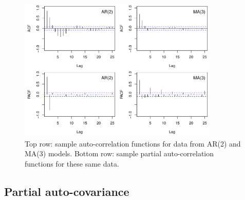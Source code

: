 \documentclass{article}
\begin{document}
\begin{itemize}
\begin{figure}[htb]
\centering
\includegraphics[width=0.85\textwidth]{fig/auto-cor-1.pdf}
\caption{Top row: sample auto-correlation functions for data from AR(2) and
  MA(3) models. Bottom row: sample partial auto-correlation functions for these
  same data.} 
\label{fig:auto_cor}
\end{figure}
\end{itemize}

\subsection{Partial auto-covariance}
\end{document}
